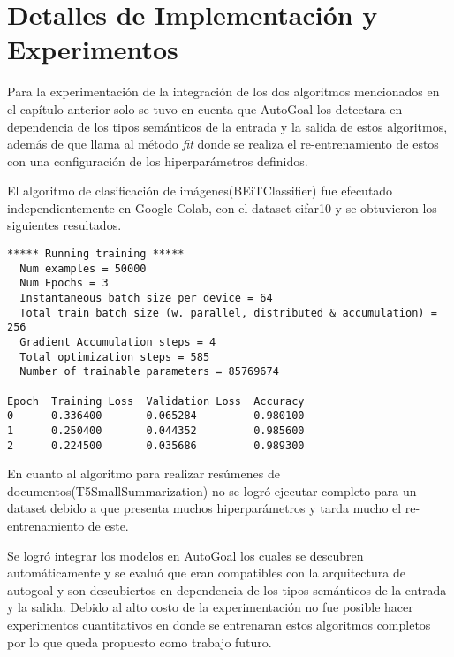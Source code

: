 \chapter{Detalles de Implementación y Experimentos}\label{chapter:implementation}
Para la experimentación de la integración de los dos algoritmos mencionados en el capítulo anterior solo se tuvo en cuenta que AutoGoal los detectara en dependencia de los tipos semánticos de la entrada y la salida de estos algoritmos, además de que llama al método \textit{fit} donde se realiza el re-entrenamiento de estos con una configuración de los hiperparámetros definidos. 

El algoritmo de clasificación de imágenes(BEiTClassifier) fue efecutado independientemente en Google Colab, con el dataset cifar10 y se obtuvieron los siguientes resultados.

\begin{verbatim}
***** Running training *****
  Num examples = 50000
  Num Epochs = 3
  Instantaneous batch size per device = 64
  Total train batch size (w. parallel, distributed & accumulation) = 256
  Gradient Accumulation steps = 4
  Total optimization steps = 585
  Number of trainable parameters = 85769674

Epoch  Training Loss  Validation Loss  Accuracy
0      0.336400       0.065284         0.980100
1      0.250400       0.044352         0.985600
2      0.224500       0.035686         0.989300
\end{verbatim}

En cuanto al algoritmo para realizar resúmenes de documentos(T5SmallSummarization) no se logró ejecutar completo para un dataset debido a que presenta muchos hiperparámetros y tarda mucho el re-entrenamiento de este.

Se logró integrar los modelos en AutoGoal los cuales se descubren automáticamente y se evaluó que eran compatibles con la arquitectura de autogoal y son descubiertos en dependencia de los tipos semánticos de la entrada y la salida. Debido al alto costo de la experimentación no fue posible hacer experimentos cuantitativos en donde se entrenaran estos algoritmos completos por lo que queda propuesto como trabajo futuro.
